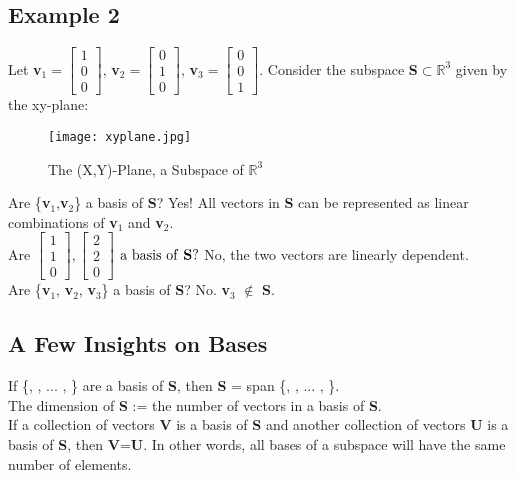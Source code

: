 \documentclass{article}
\theoremstyle{definition}
\begin{document}
\subsection{Example 2}
Let \textbf{v}$_{1}=$$\begin{bmatrix}1\\0\\0\end{bmatrix}$$ $,  \textbf{v}$_{2}=$$\begin{bmatrix}0\\1\\0\end{bmatrix}$$ $, \textbf{v}$_{3}=$$\begin{bmatrix}0\\0\\1\end{bmatrix}$$ $. Consider the subspace \textbf{S}$\subset\mathbb{R}^{3}$ given by the xy-plane:\\
\linebreak
\begin{figure}[H]
\texttt{[image: xyplane.jpg]}
\caption{ The (X,Y)-Plane, a Subspace of $\mathbb{R}^{3}$}
\end{figure}
Are \{\textbf{v}$_{1}$,\textbf{v}$_{2}$\} a basis of \textbf{S}? Yes! All vectors in \textbf{S} can be represented as linear combinations of \textbf{v}$_{1}$ and \textbf{v}$_{2}$.\\
\linebreak
$\text{Are }$$\begin{bmatrix}1\\1\\0\end{bmatrix}$$ , $$\begin{bmatrix}2\\2\\0\end{bmatrix}$$\text{ a basis of \textbf{S}?}$ No, the two vectors are linearly dependent.\\
\linebreak
Are \{\textbf{v}$_{1}$, \textbf{v}$_{2}$, \textbf{v}$_{3}$\} a basis of \textbf{S}? No. \textbf{v}$_{3}$ $\notin$ \textbf{S}.
\subsection{A Few Insights on Bases}
If \{, , ... , \} are a basis of \textbf{S}, then \textbf{S} = span \{, , ... , \}.\\
\linebreak
The dimension of \textbf{S} := the number of vectors in a basis of \textbf{S}.\\
\linebreak
If a collection of vectors \textbf{V} is a basis of \textbf{S} and another collection of vectors \textbf{U} is a basis of \textbf{S}, then \textbar\textbf{V}\textbar =\textbar\textbf{U}\textbar. In other words, all bases of a subspace will have the same number of elements.
\end{document}
